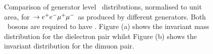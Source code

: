 \begin{figure}
\centering
        \vspace{-5mm}
        \vspace{-2mm}
    \caption[Comparison of generator level \mZ\ distributions, normalised to
    unit area, for \qqZZ $\ra\eemm$ as produced by different generators.]{\small
    Comparison of generator level \mZ\ distributions, normalised to
    unit area, for \qqZZ $\ra\eemm$ as produced by different generators. Both 
    \Z\ bosons
    are required to have \sstooos. Figure (a)
    shows the invariant mass distribution for the dielectron pair whilst Figure 
    (b) shows the invariant distribution for the dimuon pair.
    } 
    
    \label{fig:gen-comp-mZ} 
    \end{figure}

